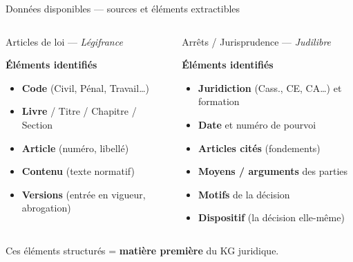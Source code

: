 \documentclass[aspectratio=169,10pt]{beamer}
\newcommand{\keybox}[1]{%
  \begin{center}
  \colorbox{accentsoft}{\parbox{0.9\linewidth}{\centering #1}}
  \end{center}}
\begin{document}
\begin{frame}{Données disponibles --- sources et éléments extractibles}
  \begin{columns}[T]
    \begin{block}{\small Articles de loi --- \textit{Légifrance}}
      \centering

      \vspace{0.4em}
      \footnotesize\textbf{Éléments identifiés}
      \begin{itemize}\scriptsize
        \item \textbf{Code} (Civil, Pénal, Travail\ldots)
        \item \textbf{Livre} / Titre / Chapitre / Section
        \item \textbf{Article} (numéro, libellé)
        \item \textbf{Contenu} (texte normatif)
        \item \textbf{Versions} (entrée en vigueur, abrogation)
      \end{itemize}
    \end{block}

    \begin{block}{\small Arrêts / Jurisprudence --- \textit{Judilibre}}
      \centering


      \vspace{0.4em}
      \footnotesize\textbf{Éléments identifiés}
      \begin{itemize}\scriptsize
        \item \textbf{Juridiction} (Cass., CE, CA\ldots) et formation
        \item \textbf{Date} et numéro de pourvoi
        \item \textbf{Articles cités} (fondements)
        \item \textbf{Moyens / arguments} des parties
        \item \textbf{Motifs} de la décision
        \item \textbf{Dispositif} (la décision elle-même)
      \end{itemize}
    \end{block}
  \end{columns}

  \vspace{0.3em}
  \keybox{\small Ces éléments structurés = \textbf{matière première} du KG juridique.}
\end{frame}

\end{document}
